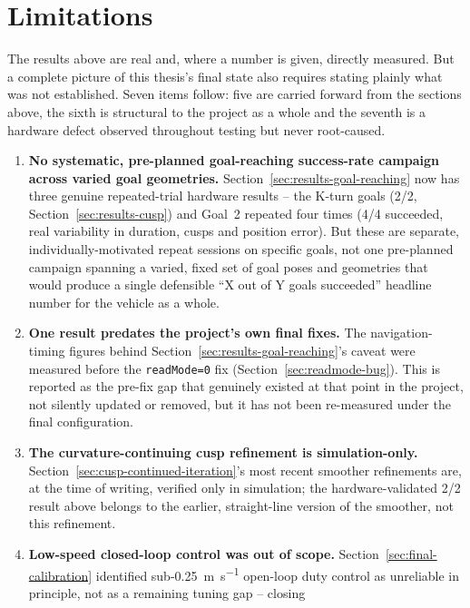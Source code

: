 \section{Limitations}
\label{sec:results-limitations}

The results above are real and, where a number is given, directly
measured. But a complete picture of this thesis's final state also
requires stating plainly what was not established. Seven items
follow: five are carried forward from the sections above, the sixth
is structural to the project as a whole and the seventh is a
hardware defect observed throughout testing but never root-caused.

\begin{enumerate}
  \item \textbf{No systematic, pre-planned goal-reaching success-rate
    campaign across varied goal geometries.} Section~\ref{sec:results-goal-reaching}
    now has three genuine repeated-trial hardware results -- the
    K-turn goals (2/2, Section~\ref{sec:results-cusp}) and Goal~2
    repeated four times (4/4 succeeded, real variability in duration,
    cusps and position error). But these are separate,
    individually-motivated repeat sessions on specific goals, not one
    pre-planned campaign spanning a varied,
    fixed set of goal poses and geometries that would produce a single
    defensible ``X out of Y goals succeeded'' headline number for the
    vehicle as a whole.
  \item \textbf{One result predates the project's own final fixes.}
    The navigation-timing figures behind
    Section~\ref{sec:results-goal-reaching}'s caveat were measured
    before the \texttt{readMode=0} fix (Section~\ref{sec:readmode-bug}).
    This is reported as the pre-fix gap that genuinely existed at that
    point in the project, not silently updated or removed, but it has
    not been re-measured under the final configuration.
  \item \textbf{The curvature-continuing cusp refinement is
    simulation-only.} Section~\ref{sec:cusp-continued-iteration}'s
    most recent smoother refinements are, at the time of writing,
    verified only in simulation; the hardware-validated 2/2 result
    above belongs to the earlier, straight-line version of the
    smoother, not this refinement.
  \item \textbf{Low-speed closed-loop control was out of scope.}
    Section~\ref{sec:final-calibration} identified
    sub-\SI{0.25}{\meter\per\second} open-loop duty control as
    unreliable in principle, not as a remaining tuning gap -- closing

\end{enumerate}
